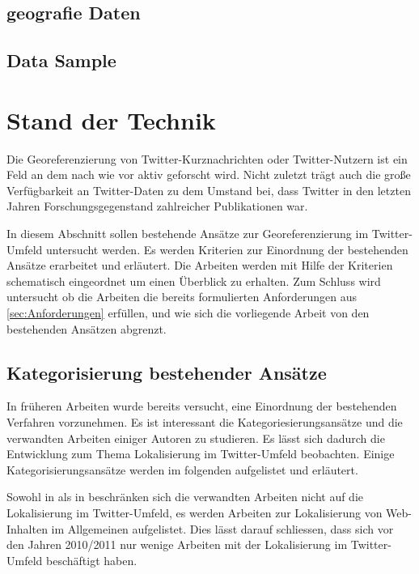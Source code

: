 	\section{geografie Daten}


	\section{Data Sample}




\chapter{Stand der Technik} 
	Die Georeferenzierung von Twitter-Kurznachrichten oder Twitter-Nutzern ist ein Feld an dem nach wie vor aktiv geforscht wird.
	Nicht zuletzt trägt auch die große Verfügbarkeit an Twitter-Daten zu dem Umstand bei, dass Twitter in den letzten Jahren Forschungsgegenstand zahlreicher Publikationen war. 
	
	In diesem Abschnitt sollen bestehende Ansätze zur Georeferenzierung im Twitter-Umfeld untersucht werden. 
	Es werden Kriterien zur Einordnung der bestehenden Ansätze erarbeitet und erläutert.   
	Die Arbeiten werden mit Hilfe der Kriterien schematisch eingeordnet um einen Überblick zu erhalten. 
	Zum Schluss wird untersucht ob die Arbeiten die bereits formulierten Anforderungen aus \ref{sec:Anforderungen} erfüllen, und wie sich die vorliegende Arbeit von den bestehenden Ansätzen abgrenzt.    

		\section{Kategorisierung bestehender Ansätze}

		In früheren Arbeiten wurde bereits versucht, eine Einordnung der bestehenden Verfahren vorzunehmen. 
		Es ist interessant die Kategoriesierungsansätze und die verwandten Arbeiten einiger Autoren zu studieren.
		Es lässt sich dadurch die Entwicklung zum Thema Lokalisierung im Twitter-Umfeld beobachten. 
		Einige Kategorisierungsansätze werden im folgenden aufgelistet und erläutert.

		Sowohl in \cite{Hecht2011} als in \cite{Cheng2010} beschränken sich die verwandten Arbeiten nicht auf die Lokalisierung im Twitter-Umfeld, es werden Arbeiten zur Lokalisierung von Web-Inhalten im Allgemeinen aufgelistet. 
		Dies lässt darauf schliessen, dass sich vor den Jahren 2010/2011 nur wenige Arbeiten mit der Lokalisierung im Twitter-Umfeld beschäftigt haben.  
		
